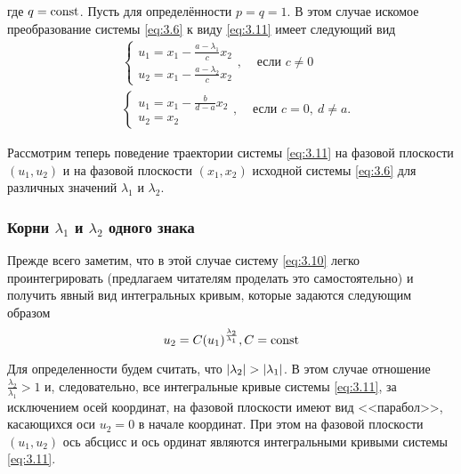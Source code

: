 где $q = \textrm{const}$. Пусть для определённости $p=q=1$. В этом случае искомое преобразование системы \eqref{eq:3.6} к виду \eqref{eq:3.11} имеет следующий вид
\begin{equation}
        \label{eq:3.18}
        \begin{aligned}
               & \begin{cases}
                        u_1 = x_1 - \frac{a- \lambda_1}{c} x_2 \\
                        u_2 = x_1 - \frac{a- \lambda_2}{c} x_2
                \end{cases},
                &\text{ если } c\neq 0 \\
               & \begin{cases}
                       u_1 = x_1 - \frac{b}{d-a} x_2 \\
                       u_2=x_2 
                \end{cases},
                &\text{если } c=0,~ d\neq a.
        \end{aligned}
\end{equation}

Рассмотрим теперь поведение траектории системы \eqref{eq:3.11} на фазовой плоскости $(u_1,u_2)$ и на фазовой плоскости $(x_1,x_2)$ исходной системы \eqref{eq:3.6} для различных значений $\lambda_1$ и $\lambda_2$.

\subsubsection{Корни $\lambda_1$ и $\lambda_2$ одного знака}%
\label{ssub:3.2.1a}

Прежде всего заметим, что в этой случае систему \eqref{eq:3.10} легко проинтегрировать (предлагаем читателям проделать это самостоятельно) и получить явный вид интегральных кривым, которые задаются следующим образом
\begin{equation}
        \label{eq:3.20}
        u_2 = C(u_1) ^{\frac{ \lambda_2}{\lambda_1}} , C=\textrm{const} 
\end{equation}

Для определенности будем считать, что $\abs{ \lambda_2}> \abs{\lambda_1}$. В этом случае отношение 
$\frac{\lambda_2}{\lambda_1} >1$ и, следовательно, все интегральные кривые системы \eqref{eq:3.11}, за исключением осей координат, на фазовой плоскости имеют вид <<парабол>>, касающихся оси $u_2=0$ в начале координат. При этом на фазовой плоскости $(u_1,u_2)$ ось абсцисс и ось ординат являются интегральными кривыми системы \eqref{eq:3.11}.

